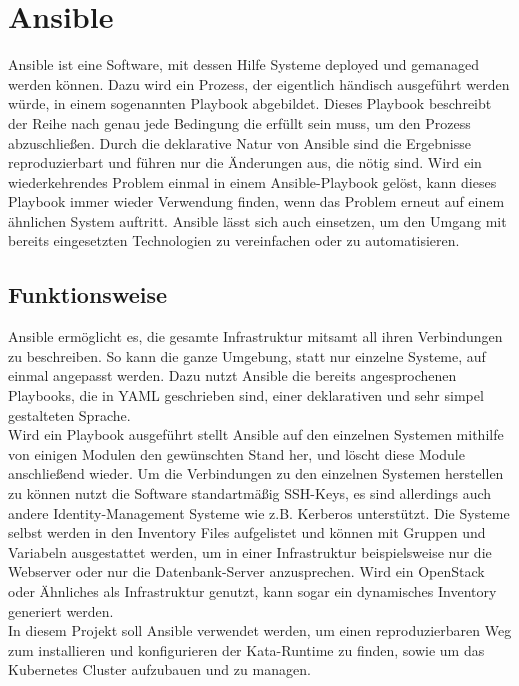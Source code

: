 


\section{Ansible}
Ansible ist eine Software, mit dessen Hilfe Systeme deployed und gemanaged werden können. 
Dazu wird ein Prozess, der eigentlich händisch ausgeführt werden würde, in einem sogenannten Playbook abgebildet.
Dieses Playbook beschreibt der Reihe nach genau jede Bedingung die erfüllt sein muss, um den Prozess abzuschließen.
Durch die deklarative Natur von Ansible sind die Ergebnisse reproduzierbart und führen nur die Änderungen aus, die nötig sind.
Wird ein wiederkehrendes Problem einmal in einem Ansible-Playbook gelöst, kann dieses Playbook immer wieder Verwendung finden, wenn das Problem erneut auf einem ähnlichen System auftritt.
Ansible lässt sich auch einsetzen, um den Umgang mit bereits eingesetzten Technologien zu vereinfachen oder zu automatisieren.
\cite{ansible}

\subsection{Funktionsweise}
Ansible ermöglicht es, die gesamte Infrastruktur mitsamt all ihren Verbindungen zu beschreiben. 
So kann die ganze Umgebung, statt nur einzelne Systeme, auf einmal angepasst werden.
Dazu nutzt Ansible die bereits angesprochenen Playbooks, die in \ac{YAML} geschrieben sind, einer deklarativen und sehr simpel gestalteten Sprache.
\\
Wird ein Playbook ausgeführt stellt Ansible auf den einzelnen Systemen mithilfe von einigen Modulen den gewünschten Stand her, und löscht diese Module anschließend wieder. 
Um die Verbindungen zu den einzelnen Systemen herstellen zu können nutzt die Software standartmäßig \ac{SSH}-Keys, es sind allerdings auch andere Identity-Management Systeme wie z.B. Kerberos unterstützt.
Die Systeme selbst werden in den Inventory Files aufgelistet und können mit Gruppen und Variabeln ausgestattet werden, um in einer Infrastruktur beispielsweise nur die Webserver oder nur die Datenbank-Server anzusprechen.
Wird ein OpenStack oder Ähnliches als Infrastruktur genutzt, kann sogar ein dynamisches Inventory generiert werden.
\cite{how_ansible_works}
\\
In diesem Projekt soll Ansible verwendet werden, um einen reproduzierbaren Weg zum installieren und konfigurieren der Kata-Runtime zu finden, sowie um das Kubernetes Cluster aufzubauen und zu managen. 


